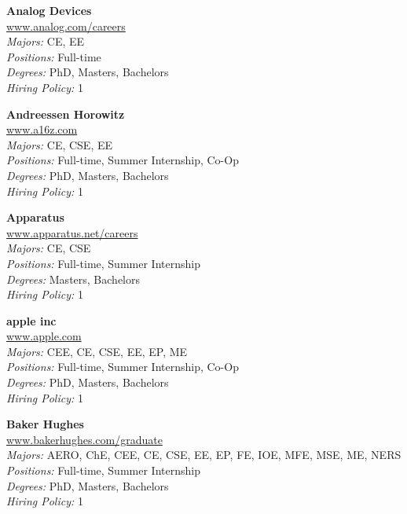 \documentclass[twoside]{article}
\begin{document}
\begin{center}
\begin{multicols}{3}
\begin{minipage}{.9\columnwidth}{\Large\bf Analog Devices }\\
	\url{www.analog.com/careers}\\
	\emph{Majors:} CE, EE\\
	\emph{Positions:} Full-time\\
	\emph{Degrees:} PhD, Masters, Bachelors\\
	\emph{Hiring Policy:} 1\\
\end{minipage}
 
\begin{minipage}{.9\columnwidth}{\Large\bf Andreessen Horowitz }\\
	\url{www.a16z.com}\\
	\emph{Majors:} CE, CSE, EE\\
	\emph{Positions:} Full-time, Summer Internship, Co-Op\\
	\emph{Degrees:} PhD, Masters, Bachelors\\
	\emph{Hiring Policy:} 1\\
\end{minipage}
 
\begin{minipage}{.9\columnwidth}{\Large\bf Apparatus }\\
	\url{www.apparatus.net/careers}\\
	\emph{Majors:} CE, CSE\\
	\emph{Positions:} Full-time, Summer Internship\\
	\emph{Degrees:} Masters, Bachelors\\
	\emph{Hiring Policy:} 1\\
\end{minipage}
 
\begin{minipage}{.9\columnwidth}{\Large\bf apple inc }\\
	\url{www.apple.com}\\
	\emph{Majors:} CEE, CE, CSE, EE, EP, ME\\
	\emph{Positions:} Full-time, Summer Internship, Co-Op\\
	\emph{Degrees:} PhD, Masters, Bachelors\\
	\emph{Hiring Policy:} 1\\
\end{minipage}
 
\begin{minipage}{.9\columnwidth}{\Large\bf Baker Hughes }\\
	\url{www.bakerhughes.com/graduate}\\
	\emph{Majors:} AERO, ChE, CEE, CE, CSE, EE, EP, FE, IOE, MFE, MSE, ME, NERS\\
	\emph{Positions:} Full-time, Summer Internship\\
	\emph{Degrees:} PhD, Masters, Bachelors\\
	\emph{Hiring Policy:} 1\\
\end{minipage}
 

\end{multicols}
\end{center}
\end{document}
